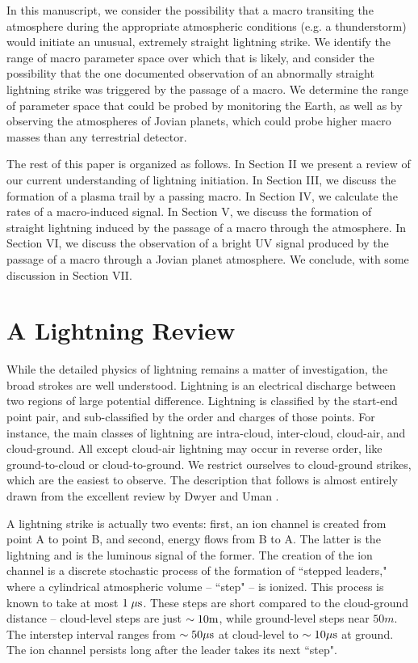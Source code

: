 \documentclass[%
 reprint,
 amsmath,amssymb,
 aps,
]{revtex4-2}
\newcommand{\vtwo}[1]{{\color{red} #1}}
\begin{document}
    In this manuscript, we consider the possibility that a macro transiting the atmosphere during the appropriate atmospheric conditions (e.g. a thunderstorm) would initiate an unusual, extremely straight lightning strike. We identify the range of macro parameter space over which that is likely, and consider the possibility that the one documented observation of an abnormally straight lightning strike was triggered by the passage of a macro.  We determine the range of parameter space that could be probed by monitoring the Earth, as well as by observing the atmospheres of Jovian planets, which could probe higher macro masses than any terrestrial detector. 

    The rest of this paper is organized as follows. In Section II we present a review of our current understanding of lightning initiation. In Section III, we discuss the formation of a plasma trail by a passing macro. In Section IV, we calculate the rates of a macro-induced signal. \vtwo{In Section V, we discuss the formation of straight lightning induced by the passage of a macro through the atmosphere.} In Section VI, we discuss the observation of a bright UV signal produced by the passage of a macro through a Jovian planet atmosphere. We conclude, with some discussion in Section VII.



\section{A Lightning Review} %
\label{sec:a_lightning_review}

    While the detailed physics of lightning remains a matter of investigation, the broad strokes are well understood. Lightning is an electrical discharge between two regions of large potential difference. Lightning is classified by the start-end point pair, and sub-classified by the order and charges of those points. For instance, the main classes of lightning are intra-cloud, inter-cloud, cloud-air, and cloud-ground. All except cloud-air lightning may occur in reverse order, like ground-to-cloud or cloud-to-ground. We restrict ourselves to cloud-ground strikes, which are the easiest to observe. The description that follows is almost entirely drawn from the excellent review by Dwyer and Uman \vtwo{\citep{DwyerUman2014}}.

    A lightning strike is actually two events: first, an ion channel is created from point A to point B, and second, energy flows from B to A. The latter is the lightning and is the luminous signal of the former. The creation of the ion channel is a discrete stochastic process of the formation of ``stepped leaders," where a cylindrical atmospheric volume -- ``step" -- is ionized. This process is known to take at most $1 \; \mu\rm{s}$. These steps are short compared to the cloud-ground distance -- cloud-level steps are just $\sim10 \rm{m}$, while ground-level steps near $50 m$. The \vtwo{interstep} interval ranges from $\sim50 \mu\rm{s}$ at cloud-level to $\sim10 \mu\rm{s}$ at ground. The ion channel persists long after the leader takes its next ``step". 
\end{document}
